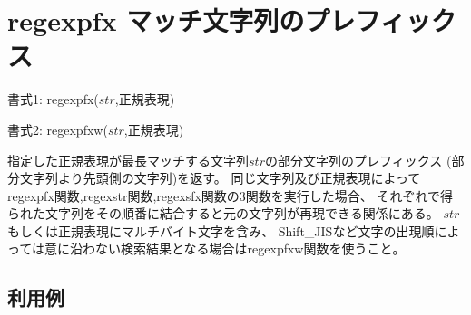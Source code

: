
%

\section{regexpfx マッチ文字列のプレフィックス\label{sect:regexpfx}}

書式1: regexpfx($str$,正規表現)

書式2: regexpfxw($str$,正規表現)

指定した正規表現が最長マッチする文字列$str$の部分文字列のプレフィックス
(部分文字列より先頭側の文字列)を返す。
同じ文字列及び正規表現によってregexpfx関数,regexstr関数,regexsfx関数の3関数を実行した場合、
それぞれで得られた文字列をその順番に結合すると元の文字列が再現できる関係にある。
$str$もしくは正規表現にマルチバイト文字を含み、
Shift\_JISなど文字の出現順によっては意に沿わない検索結果となる場合はregexpfxw関数を使うこと。

\subsection*{利用例}


%

